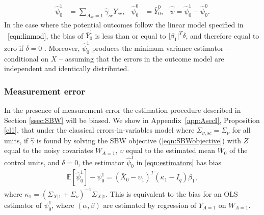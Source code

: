 \documentclass[aoas]{imsart}
\theoremstyle{plain}
\theoremstyle{remark}
\begin{document}
\begin{align}\label{eqn:estimators}
\hat{\psi}_0^1 &= \sum_{A_{sc}=1} \hat{\gamma}_{sc} Y_{sc}, & \hat{\psi}_0^0 & = \bar{Y}_0^0, & \hat{\psi} = \hat{\psi}_0^1 - \hat{\psi}_0^0.
\end{align}
%
In the case where the potential outcomes follow the linear model specified in ~\eqref{eqn:linmod}, the bias of $\bar{Y}^1_0$ is less than or equal to $\lvert\beta_1\rvert^T\delta$, and therefore equal to zero if $\delta = 0$ \citep{zubizarreta2015stable}. Moreover, $\hat{\psi}_0^1$ produces the minimum variance estimator -- conditional on $X$ -- assuming that the errors in the outcome model are independent and identically distributed.

\subsubsection{Measurement error}\label{ssec:methodsmsrment} 

In the presence of measurement error the estimation procedure described in Section \ref{ssec:SBW} will be biased. We show in Appendix~\ref{app:AsecI}, Proposition \ref{cl1}, that under the classical errors-in-variables model where $\Sigma_{\nu,sc} = \Sigma_{\nu}$ for all units, if $\hat{\gamma}$ is found by solving the SBW objective (\ref{eqn:SBWobjective}) with $Z$ equal to the noisy covariates $W_{A=1}$, $\upsilon$ equal to the estimated mean $\bar{W}_0$ of the control units, and $\delta=0$, the estimator $\hat{\psi}_0^1$ in \eqref{eqn:estimators} has bias
\begin{align*}
\mathbb{E}[\hat{\psi}_0^1] - \psi_0^1 = (\bar{X}_0 - \upsilon_1)^T(\kappa_1 - I_q)\beta_1,  
\end{align*}
where $\kappa_1 = (\Sigma_{X|1} + \Sigma_{\nu})^{-1}\Sigma_{X|1}$. This is equivalent to the bias for an OLS estimator of $\psi_0^1$, where $(\alpha, \beta)$ are estimated by regression of $Y_{A=1}$ on $W_{A=1}$.
\end{document}
